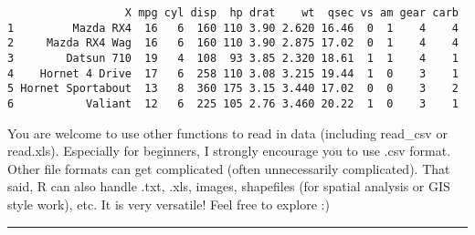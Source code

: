 \documentclass[
  letterpaper,
  DIV=11,
  numbers=noendperiod]{scrartcl}
\begin{document}
\begin{verbatim}
                  X mpg cyl disp  hp drat    wt  qsec vs am gear carb
1         Mazda RX4  16   6  160 110 3.90 2.620 16.46  0  1    4    4
2     Mazda RX4 Wag  16   6  160 110 3.90 2.875 17.02  0  1    4    4
3        Datsun 710  19   4  108  93 3.85 2.320 18.61  1  1    4    1
4    Hornet 4 Drive  17   6  258 110 3.08 3.215 19.44  1  0    3    1
5 Hornet Sportabout  13   8  360 175 3.15 3.440 17.02  0  0    3    2
6           Valiant  12   6  225 105 2.76 3.460 20.22  1  0    3    1
\end{verbatim}

You are welcome to use other functions to read in data (including
read\_csv or read.xls). Especially for beginners, I strongly encourage
you to use .csv format. Other file formats can get complicated (often
unnecessarily complicated). That said, R can also handle .txt, .xls,
images, shapefiles (for spatial analysis or GIS style work), etc. It is
very versatile! Feel free to explore :)

\begin{center}\rule{0.5\linewidth}{0.5pt}\end{center}
\end{document}
